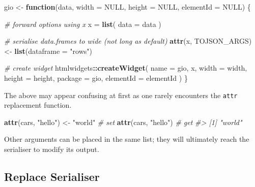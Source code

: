 \documentclass[
  10pt,
]{krantz}
\makeatletter
\newenvironment{Shaded}{\begin{snugshade}}{\end{snugshade}}
\newcommand{\CommentTok}[1]{\textcolor[rgb]{0.37,0.37,0.37}{\textit{#1}}}
\newcommand{\ControlFlowTok}[1]{\textcolor[rgb]{0.27,0.27,0.27}{\textbf{#1}}}
\newcommand{\DataTypeTok}[1]{\textcolor[rgb]{0.27,0.27,0.27}{#1}}
\newcommand{\KeywordTok}[1]{\textcolor[rgb]{0.27,0.27,0.27}{\textbf{#1}}}
\newcommand{\NormalTok}[1]{#1}
\newcommand{\OperatorTok}[1]{\textcolor[rgb]{0.43,0.43,0.43}{\textbf{#1}}}
\newcommand{\OtherTok}[1]{\textcolor[rgb]{0.37,0.37,0.37}{#1}}
\newcommand{\StringTok}[1]{\textcolor[rgb]{0.5,0.5,0.5}{#1}}
\newenvironment{kframe}{%
\medskip{}
\setlength{\fboxsep}{.8em}
 \def\at@end@of@kframe{}%
 \ifinner\ifhmode%
  \def\at@end@of@kframe{\end{minipage}}%
  \begin{minipage}{\columnwidth}%
 \fi\fi%
 \def\FrameCommand##1{\hskip\@totalleftmargin \hskip-\fboxsep
 \colorbox{shadecolor}{##1}\hskip-\fboxsep
     \hskip-\linewidth \hskip-\@totalleftmargin \hskip\columnwidth}%
 \MakeFramed {\advance\hsize-\width
   \@totalleftmargin\z@ \linewidth\hsize
   \@setminipage}}%
 {\par\unskip\endMakeFramed%
 \at@end@of@kframe}
\renewenvironment{Shaded}{\begin{kframe}}{\end{kframe}}
\makeatother
\begin{document}
\begin{Shaded}
\begin{Highlighting}[]
\NormalTok{gio <{-}}\StringTok{ }\ControlFlowTok{function}\NormalTok{(data, }\DataTypeTok{width =} \OtherTok{NULL}\NormalTok{, }\DataTypeTok{height =} \OtherTok{NULL}\NormalTok{, }
  \DataTypeTok{elementId =} \OtherTok{NULL}\NormalTok{) \{}

  \CommentTok{\# forward options using x}
\NormalTok{  x =}\StringTok{ }\KeywordTok{list}\NormalTok{(}
    \DataTypeTok{data =}\NormalTok{ data}
\NormalTok{  )}

  \CommentTok{\# serialise data.frames to wide (not long as default)}
  \KeywordTok{attr}\NormalTok{(x, }\StringTok{\textquotesingle{}TOJSON\_ARGS\textquotesingle{}}\NormalTok{) <{-}}\StringTok{ }\KeywordTok{list}\NormalTok{(}\DataTypeTok{dataframe =} \StringTok{"rows"}\NormalTok{)}

  \CommentTok{\# create widget}
\NormalTok{  htmlwidgets}\OperatorTok{::}\KeywordTok{createWidget}\NormalTok{(}
    \DataTypeTok{name =} \StringTok{\textquotesingle{}gio\textquotesingle{}}\NormalTok{,}
\NormalTok{    x,}
    \DataTypeTok{width =}\NormalTok{ width,}
    \DataTypeTok{height =}\NormalTok{ height,}
    \DataTypeTok{package =} \StringTok{\textquotesingle{}gio\textquotesingle{}}\NormalTok{,}
    \DataTypeTok{elementId =}\NormalTok{ elementId}
\NormalTok{  )}
\NormalTok{\}}
\end{Highlighting}
\end{Shaded}

The above may appear confusing at first as one rarely encounters the \texttt{attr} replacement function.

\begin{Shaded}
\begin{Highlighting}[]
\KeywordTok{attr}\NormalTok{(cars, }\StringTok{"hello"}\NormalTok{) <{-}}\StringTok{ "world"} \CommentTok{\# set }
\KeywordTok{attr}\NormalTok{(cars, }\StringTok{"hello"}\NormalTok{) }\CommentTok{\# get }
\CommentTok{\#> [1] "world"}
\end{Highlighting}
\end{Shaded}

Other arguments can be placed in the same list; they will ultimately reach the serialiser to modify its output.

\hypertarget{widgets-full-transform-data-replace}{%
\subsection{Replace Serialiser}\label{widgets-full-transform-data-replace}}
\end{document}
